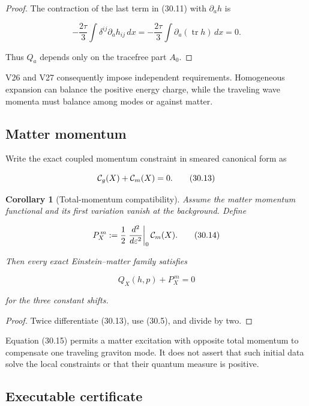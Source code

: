\documentclass[11pt]{article}
\newtheorem{corollary}[theorem]{Corollary}
\theoremstyle{remark}
\begin{document}
\begin{proof}
The contraction of the last term in (30.11) with
\(\partial_a h\) is

\[
 -\frac{2\tau}{3}\int\delta^{ij}\partial_a h_{ij}\,dx
 =-\frac{2\tau}{3}\int\partial_a(\operatorname{tr}h)\,dx=0.   \tag{30.12}
\]

Thus \(Q_a\) depends only on the tracefree part \(A_0\).
\end{proof}

V26 and V27 consequently impose independent requirements.  Homogeneous
expansion can balance the positive energy charge, while the traveling
wave momenta must balance among modes or against matter.

\subsection{Matter momentum}

Write the exact coupled momentum constraint in smeared canonical form as

\[
 {\cal C}_g(X)+{\cal C}_m(X)=0.                               \tag{30.13}
\]

\begin{corollary}[Total-momentum compatibility]
\label{cor:v19v27-matter}
Assume the matter momentum functional and its first variation vanish at
the background.  Define

\[
 P_X^{\,m}:=\frac12
 \left.\frac{d^2}{d\varepsilon^2}\right|_0{\cal C}_m(X).
                                                                    \tag{30.14}
\]

Then every exact Einstein--matter family satisfies

\[
 Q_X(h,p)+P_X^{\,m}=0                                         \tag{30.15}
\]

for the three constant shifts.
\end{corollary}

\begin{proof}
Twice differentiate (30.13), use (30.5), and divide by two.
\end{proof}

Equation (30.15) permits a matter excitation with opposite total momentum
to compensate one traveling graviton mode.  It does not assert that such
initial data solve the local constraints or that their quantum measure is
positive.

\subsection{Executable certificate}
\end{document}
